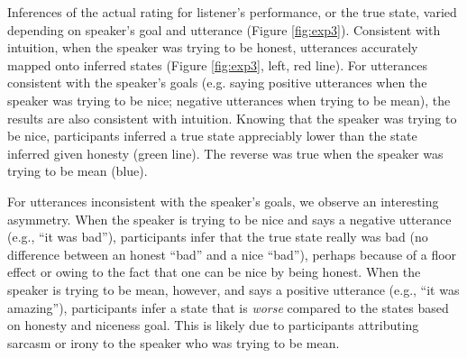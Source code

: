 \documentclass[10pt,letterpaper]{article}
\begin{document}

Inferences of the actual rating for listener's performance, or the true state, varied depending on speaker's goal and utterance (Figure \ref{fig:exp3}).
Consistent with intuition, when the speaker was trying to be honest, utterances accurately mapped onto inferred states (Figure \ref{fig:exp3}, left, red line).
For utterances consistent with the speaker's goals (e.g. saying positive utterances when the speaker was trying to be nice; negative utterances when trying to be mean), the results are also consistent with intuition.
Knowing that the speaker was trying to be nice, participants inferred a true state appreciably lower than the state inferred given honesty (green line).
The reverse was true when the speaker was trying to be mean (blue).


For utterances inconsistent with the speaker's goals, we observe an interesting asymmetry.
When the speaker is trying to be nice and says a negative utterance (e.g., ``it was bad''), participants infer that the true state really was bad (no difference between an honest ``bad'' and a nice ``bad''), perhaps because of a floor effect or owing to the fact that one can be nice by being honest.
When the speaker is trying to be mean, however, and says a positive utterance (e.g., ``it was amazing''), participants infer a state that is \emph{worse} compared to the states based on honesty and niceness goal.
This is likely due to participants attributing sarcasm or irony to the speaker who was trying to be mean.
\end{document}
